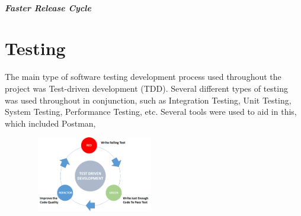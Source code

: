 \subparagraph{Faster Release Cycle}


\section{Testing}
The main type of software testing development process used throughout the project was Test-driven development (TDD). Several different types of testing was used throughout in conjunction, such as Integration Testing, Unit Testing, System Testing, Performance Testing, etc. Several tools were used to aid in this, which included Postman, 

\centering\includegraphics[width=8cm,height=3.3cm,keepaspectratio]{images/tdd}
